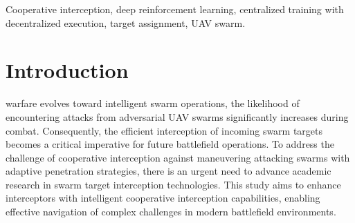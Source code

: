 \documentclass[lettersize,journal]{IEEEtran}
\begin{document}
\begin{IEEEkeywords}
Cooperative interception, deep reinforcement learning, centralized training with decentralized
execution, target assignment, UAV swarm.
\end{IEEEkeywords}


\section{Introduction}
\label{sec:introduction}
 warfare evolves toward intelligent swarm operations, the likelihood of
encountering attacks from adversarial UAV swarms significantly increases during combat.
Consequently, the efficient interception of incoming swarm targets becomes a critical
imperative for future battlefield operations.
To address the challenge of cooperative interception against maneuvering attacking swarms with
adaptive penetration strategies, there is an urgent need to advance academic research in swarm
target interception technologies.
This study aims to enhance interceptors with intelligent cooperative interception capabilities,
enabling effective navigation of complex challenges in modern battlefield environments.
\end{document}

